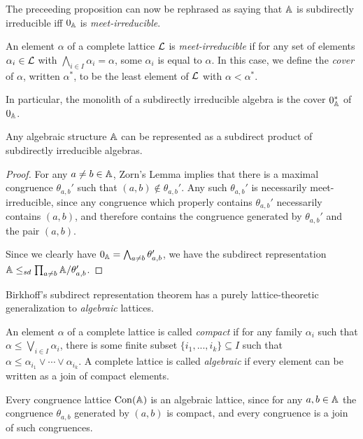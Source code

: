 \begin{appendices}
The preceeding proposition can now be rephrased as saying that $\mathbb{A}$ is subdirectly irreducible iff $0_{\mathbb{A}}$ is \emph{meet-irreducible}.

\begin{defn} An element $\alpha$ of a complete lattice $\mathcal{L}$ is \emph{meet-irreducible} if for any set of elements $\alpha_i \in \mathcal{L}$ with $\bigwedge_{i \in I} \alpha_i = \alpha$, some $\alpha_i$ is equal to $\alpha$. In this case, we define the \emph{cover} of $\alpha$, written $\alpha^*$, to be the least element of $\mathcal{L}$ with $\alpha < \alpha^*$.
\end{defn}

In particular, the monolith of a subdirectly irreducible algebra is the cover $0_{\mathbb{A}}^*$ of $0_{\mathbb{A}}$.

\begin{thm} Any algebraic structure $\mathbb{A}$ can be represented as a subdirect product of subdirectly irreducible algebras.
\end{thm}
\begin{proof} For any $a\ne b \in \mathbb{A}$, Zorn's Lemma implies that there is a maximal congruence $\theta_{a,b}'$ such that $(a,b) \not\in \theta_{a,b}'$. Any such $\theta_{a,b}'$ is necessarily meet-irreducible, since any congruence which properly contains $\theta_{a,b}'$ necessarily contains $(a,b)$, and therefore contains the congruence generated by $\theta_{a,b}'$ and the pair $(a,b)$.

Since we clearly have $0_{\mathbb{A}} = \bigwedge_{a \ne b} \theta_{a,b}'$, we have the subdirect representation $\mathbb{A} \le_{sd} \prod_{a \ne b} \mathbb{A}/\theta_{a,b}'$.
\end{proof}

Birkhoff's subdirect representation theorem has a purely lattice-theoretic generalization to \emph{algebraic} lattices.

\begin{defn} An element $\alpha$ of a complete lattice is called \emph{compact} if for any family $\alpha_i$ such that $\alpha \le \bigvee_{i \in I} \alpha_i$, there is some finite subset $\{i_1, ..., i_k\} \subseteq I$ such that $\alpha \le \alpha_{i_1} \vee \cdots \vee \alpha_{i_k}$. A complete lattice is called \emph{algebraic} if every element can be written as a join of compact elements.
\end{defn}

Every congruence lattice $\operatorname{Con}(\mathbb{A})$ is an algebraic lattice, since for any $a,b \in \mathbb{A}$ the congruence $\theta_{a,b}$ generated by $(a,b)$ is compact, and every congruence is a join of such congruences.


\end{appendices}
